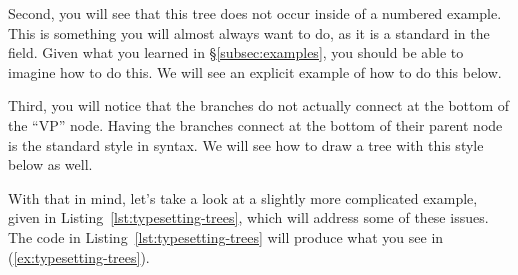 Second, you will see that this tree does not occur inside of a numbered example.
This is something you will almost always want to do, as it is a standard in the field.
Given what you learned in \S\ref{subsec:examples}, you should be able to imagine how to do this.
We will see an explicit example of how to do this below.

Third, you will notice that the branches do not actually connect at the bottom of the ``VP'' node.
Having the branches connect at the bottom of their parent node is the standard style in syntax.
We will see how to draw a tree with this style below as well.

With that in mind, let's take a look at a slightly more complicated example, given in Listing~\ref{lst:typesetting-trees}, which will address some of these issues.
The code in Listing~\ref{lst:typesetting-trees} will produce what you see in (\ref{ex:typesetting-trees}).

\begin{exe}
    \label{ex:typesetting-trees}
\end{exe}

